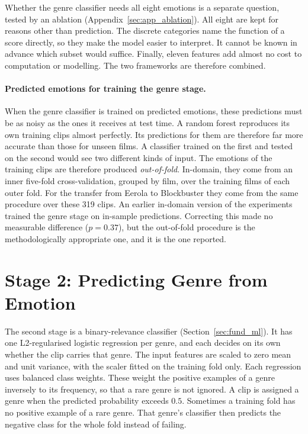 Whether the genre classifier needs all eight emotions is a separate question, tested by an ablation (Appendix~\ref{sec:app_ablation}). All eight are kept for reasons other than prediction. The discrete categories name the function of a score directly, so they make the model easier to interpret. It cannot be known in advance which subset would suffice. Finally, eleven features add almost no cost to computation or modelling. The two frameworks are therefore combined.

\paragraph{Predicted emotions for training the genre stage.} When the genre classifier is trained on predicted emotions, these predictions must be as noisy as the ones it receives at test time. A random forest reproduces its own training clips almost perfectly. Its predictions for them are therefore far more accurate than those for unseen films. A classifier trained on the first and tested on the second would see two different kinds of input. The emotions of the training clips are therefore produced \emph{out-of-fold}. In-domain, they come from an inner five-fold cross-validation, grouped by film, over the training films of each outer fold. For the transfer from Eerola to Blockbuster they come from the same procedure over these 319 clips. An earlier in-domain version of the experiments trained the genre stage on in-sample predictions. Correcting this made no measurable difference ($p=0.37$), but the out-of-fold procedure is the methodologically appropriate one, and it is the one reported.

\section{Stage 2: Predicting Genre from Emotion}
\label{sec:methods_stage2}

The second stage is a binary-relevance classifier (Section~\ref{sec:fund_ml}). It has one L2-regularised logistic regression per genre, and each decides on its own whether the clip carries that genre. The input features are scaled to zero mean and unit variance, with the scaler fitted on the training fold only. Each regression uses balanced class weights. These weight the positive examples of a genre inversely to its frequency, so that a rare genre is not ignored. A clip is assigned a genre when the predicted probability exceeds $0.5$. Sometimes a training fold has no positive example of a rare genre. That genre's classifier then predicts the negative class for the whole fold instead of failing.

